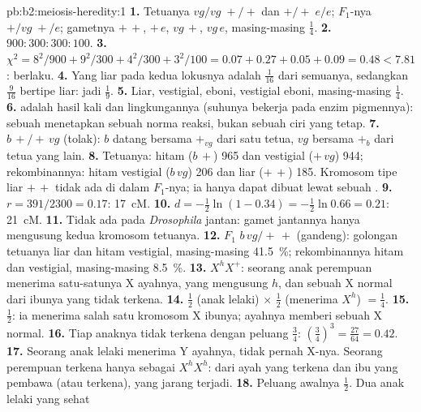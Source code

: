 \begin{solution}{pb:b2:meiosis-heredity:1}
\textbf{1.} Tetuanya $vg/vg\;+/+$ dan $+/+\;e/e$; $F_1$-nya $+/vg\;+/e$;
gametnya $+\,+$, $+\,e$, $vg\,+$, $vg\,e$, masing-masing $\tfrac14$.
\textbf{2.} $900 : 300 : 300 : 100$.
\textbf{3.} $\chi^2 = 8^2/900 + 9^2/300 + 4^2/300 + 3^2/100 = 0.07 +
0.27 + 0.05 + 0.09 = 0.48 < 7.81$:  berlaku.
\textbf{4.} Yang  liar pada kedua lokusnya adalah
$\tfrac{1}{16}$ dari semuanya, sedangkan $\tfrac{9}{16}$ bertipe liar:
jadi $\tfrac19$.
\textbf{5.} Liar, vestigial, eboni, vestigial eboni, masing-masing
$\tfrac14$.
\textbf{6.}  adalah hasil kali  dan lingkungannya
(suhunya bekerja pada enzim pigmennya): sebuah  menetapkan
sebuah norma reaksi, bukan sebuah ciri yang tetap.
\textbf{7.} $b\,+/+\,vg$ (tolak): $b$ datang bersama $+_{vg}$ dari satu
tetua, $vg$ bersama $+_b$ dari tetua yang lain.
\textbf{8.} Tetuanya: hitam ($b\,+$) 965 dan vestigial ($+\,vg$) 944;
rekombinannya: hitam vestigial ($b\,vg$) 206 dan liar ($+\,+$) 185.
Kromosom tipe liar $+\,+$ tidak ada di dalam $F_1$-nya; ia hanya dapat
dibuat lewat sebuah .
\textbf{9.} $r = 391/2300 = 0.17$: \qty{17}{cM}.
\textbf{10.} $d = -\tfrac12\ln(1 - 0.34) = -\tfrac12\ln 0.66 = 0.21$:
\qty{21}{cM}.
\textbf{11.} Tidak ada  pada \emph{Drosophila} jantan:
gamet jantannya hanya mengusung kedua kromosom tetuanya.
\textbf{12.} $F_1$ $b\,vg/+\,+$ (gandeng): golongan tetuanya liar dan
hitam vestigial, masing-masing \qty{41.5}{\%}; rekombinannya hitam dan
vestigial, masing-masing \qty{8.5}{\%}.
\textbf{13.} $X^hX^+$: seorang anak perempuan menerima satu-satunya X
ayahnya, yang mengusung $h$, dan sebuah X normal dari ibunya yang tidak
terkena.
\textbf{14.} $\tfrac12$ (anak lelaki) $\times$ $\tfrac12$ (menerima $X^h$) $=
\tfrac14$.
\textbf{15.} $\tfrac12$: ia menerima salah satu kromosom X ibunya;
ayahnya memberi sebuah X normal.
\textbf{16.} Tiap anaknya tidak terkena dengan peluang $\tfrac34$:
$(\tfrac34)^3 = \tfrac{27}{64} = 0.42$.
\textbf{17.} Seorang anak lelaki menerima Y ayahnya, tidak pernah
X-nya. Seorang perempuan terkena hanya sebagai $X^hX^h$: dari ayah
yang terkena dan ibu yang pembawa (atau terkena), yang jarang terjadi.
\textbf{18.} Peluang awalnya $\tfrac12$. Dua anak lelaki yang sehat

\end{solution}
